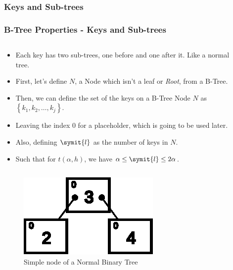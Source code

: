 \documentclass{beamer}
\begin{document}
\begin{frame}
    \subsubsection{Keys and Sub-trees}
    \frametitle{B-Tree Properties - Keys and Sub-trees}
    \begin{columns}
        \begin{column}{\textlecolumn}
            \begin{block}{}
                \vspace{-0.8cm}
                \begin{itemize}
                    \item Each key has two sub-trees, one before and one after it. Like a normal tree.
                    \item First, let's define \(N\), a Node which isn't a leaf or \emph{Root}, from a B-Tree.
                    \item Then, we can define the set of the keys on a B-Tree Node \(N\) as \(\left\{k_1, k_2, \ldots{}, k_j\right\}\).
                    \item Leaving the index 0 for a placeholder, which is going to be used later.
                    \item Also, defining \(\symit{l}\) as the number of keys in \(N\).
                    \item Such that for \(t\left(\alpha, h\right)\), we have \(\alpha \leq \symit{l} \leq 2\alpha\).
                \end{itemize}
            \end{block}
        \end{column}
        \begin{column}{\textricolumn}
        \end{column}
    \end{columns}
    \begin{figure}[h!]
        \includegraphics[height=0.175\linewidth]{resources/made/btree_2subtrees.eps}
        \caption{Simple node of a Normal Binary Tree}
    \end{figure}

    \framebreak


\end{frame}
\end{document}
